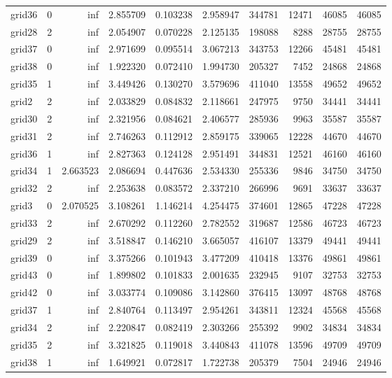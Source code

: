 \begin{longtable}{|l|r|r|r|r|r|r|r|r|r|}
grid36 & 0 & inf & 2.855709 & 0.103238 & 2.958947 & 344781 & 12471 & 46085 & 46085 \\
grid28 & 2 & inf & 2.054907 & 0.070228 & 2.125135 & 198088 & 8288 & 28755 & 28755 \\
grid37 & 0 & inf & 2.971699 & 0.095514 & 3.067213 & 343753 & 12266 & 45481 & 45481 \\
grid38 & 0 & inf & 1.922320 & 0.072410 & 1.994730 & 205327 & 7452 & 24868 & 24868 \\
grid35 & 1 & inf & 3.449426 & 0.130270 & 3.579696 & 411040 & 13558 & 49652 & 49652 \\
grid2 & 2 & inf & 2.033829 & 0.084832 & 2.118661 & 247975 & 9750 & 34441 & 34441 \\
grid30 & 2 & inf & 2.321956 & 0.084621 & 2.406577 & 285936 & 9963 & 35587 & 35587 \\
grid31 & 2 & inf & 2.746263 & 0.112912 & 2.859175 & 339065 & 12228 & 44670 & 44670 \\
grid36 & 1 & inf & 2.827363 & 0.124128 & 2.951491 & 344831 & 12521 & 46160 & 46160 \\
grid34 & 1 & 2.663523 & 2.086694 & 0.447636 & 2.534330 & 255336 & 9846 & 34750 & 34750 \\
grid32 & 2 & inf & 2.253638 & 0.083572 & 2.337210 & 266996 & 9691 & 33637 & 33637 \\
grid3 & 0 & 2.070525 & 3.108261 & 1.146214 & 4.254475 & 374601 & 12865 & 47228 & 47228 \\
grid33 & 2 & inf & 2.670292 & 0.112260 & 2.782552 & 319687 & 12586 & 46723 & 46723 \\
grid29 & 2 & inf & 3.518847 & 0.146210 & 3.665057 & 416107 & 13379 & 49441 & 49441 \\
grid39 & 0 & inf & 3.375266 & 0.101943 & 3.477209 & 410418 & 13376 & 49861 & 49861 \\
grid43 & 0 & inf & 1.899802 & 0.101833 & 2.001635 & 232945 & 9107 & 32753 & 32753 \\
grid42 & 0 & inf & 3.033774 & 0.109086 & 3.142860 & 376415 & 13097 & 48768 & 48768 \\
grid37 & 1 & inf & 2.840764 & 0.113497 & 2.954261 & 343811 & 12324 & 45568 & 45568 \\
grid34 & 2 & inf & 2.220847 & 0.082419 & 2.303266 & 255392 & 9902 & 34834 & 34834 \\
grid35 & 2 & inf & 3.321825 & 0.119018 & 3.440843 & 411078 & 13596 & 49709 & 49709 \\
grid38 & 1 & inf & 1.649921 & 0.072817 & 1.722738 & 205379 & 7504 & 24946 & 24946 \\

\end{longtable}
